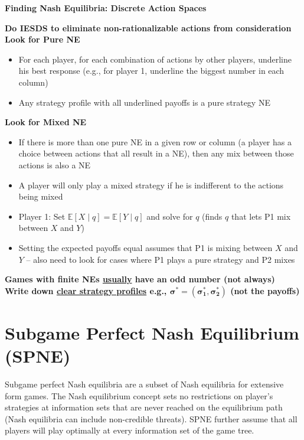\documentclass{report}
\newcommand{\FlowerSmall}{\mbox{\raisebox{-1pt}{\small\EightFlowerPetalRemoved}}} %
\begin{document}
\begin{mdframed}
	\medskip
	\begin{center} \textbf{{\large Finding Nash Equilibria: Discrete Action Spaces}}\bigskip \end{center}
	\textbf{Do IESDS to eliminate non-rationalizable actions from consideration}\\[10pt]
	\textbf{Look for Pure NE}
	\begin{itemize}[label=\FlowerSmall]
		\item{For each player, for each combination of actions by other players, underline his best response (e.g., for player 1, underline the biggest number in each column)}
		\item{Any strategy profile with all underlined payoffs is a pure strategy NE}
	\end{itemize} \medskip
	\textbf{Look for Mixed NE}
	\begin{itemize}[label=\FlowerSmall]
		\item{If there is more than one pure NE in a given row or column (a player has a choice between actions that all result in a NE), then any mix between those actions is also a NE}
		\item{A player will only play a mixed strategy if he is indifferent to the actions being mixed}
		\item{Player 1: Set $\mathbb{E}[X \mid q] = \mathbb{E}[Y \mid q]$ and solve for $q$ \hspace{10pt} (finds $q$ that lets P1 mix between $X$ and $Y$)}
		\item{Setting the expected payoffs equal assumes that P1 is mixing between $X$ and $Y$ -- also need to look for cases where P1 plays a pure strategy and P2 mixes}
	\end{itemize}\medskip
	\textbf{Games with finite NEs \underline{usually} have an odd number (not always)} \\[10pt]
	\textbf{Write down \underline{clear strategy profiles} e.g., $\boldsymbol{\sigma^* = (\sigma_1^*,\sigma_2^*)}$ (not the payoffs)}
	\smallskip
\end{mdframed}
\bigskip



\section*{Subgame Perfect Nash Equilibrium (SPNE)}\medskip

Subgame perfect Nash equilibria are a subset of Nash equilibria for extensive form games. The Nash equilibrium concept sets no restrictions on player's strategies at information sets that are never reached on the equilibrium path (Nash equilibria can include non-credible threats). SPNE further assume that all players will play optimally at every information set of the game tree. \bigskip \bigskip
\end{document}
